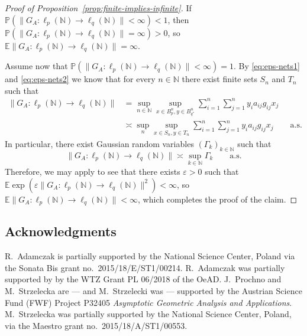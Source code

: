 \documentclass[a4paper]{amsart}
\theoremstyle{definition}
\theoremstyle{remark}
\numberwithin{equation}{section}
\newcommand*{\NN}{\mathbb{N}}
\newcommand*{\EE}{\mathbb{E}}
\newcommand*{\PP}{\mathbb{P}}
\begin{document}
\begin{proof}[Proof of Proposition~\ref{prop:finite-implies-infinite}]
	If $\PP(\|G_A\colon \ell_p(\NN) \to \ell_q(\NN) \| <\infty ) <1$, then $\PP(\|G_A\colon \ell_p(\NN) \to \ell_q(\NN) \| =\infty ) >0$, so $\EE \|G_A\colon \ell_p(\NN) \to \ell_q(\NN) \| =\infty $.
	
	 Assume now that $\PP(\|G_A\colon \ell_p(\NN) \to \ell_q(\NN) \| <\infty ) =1$. By \eqref{eq:eps-nets1} and \eqref{eq:eps-nets2} we know that for every $n\in\NN$ there exist finite sets $S_n$ and $T_n$ such that
	 \begin{align*}
 	\|G_A\colon \ell_p(\NN) \to \ell_q(\NN) \|
	&=  \sup_{n\in \NN} \sup_{x\in B_p^n, y\in B_{q^\ast}^n}  \sum_{i=1}^n \sum_{j=1}^n  y_i a_{ij} g_{ij} x_j
		\\ &\asymp	\sup_n \sup_{x\in S_n, y\in T_n}  \sum_{i=1}^n \sum_{j=1}^n  y_i a_{ij} g_{ij} x_j 	\qquad \text{a.s.}
	 \end{align*}
	 In particular, there exist Gaussian random variables $(\Gamma_k)_{k\in \NN}$ such that
	 \[
	 \|G_A\colon \ell_p(\NN) \to \ell_q(\NN) \|
		\asymp
		\sup_{k\in \NN} \Gamma_k \qquad \text{a.s.}
	\]
	  Therefore, we may apply \cite[(1.2)]{LandauShepp} to see that there exists $\varepsilon >0$ such that $\EE \exp(\varepsilon  \|G_A\colon \ell_p(\NN) \to \ell_q(\NN) \|^2 ) < \infty$, so $\EE \|G_A\colon \ell_p(\NN) \to \ell_q(\NN) \| <\infty $, which completes the proof of the claim.
	\end{proof}

\medskip

\subsection*{Acknowledgments}
R.~Adamczak is partially supported by the  National Science Center, Poland via the Sonata Bis  grant  no.\ 2015/18/E/ST1/00214. R.~Adamczak was partially supported by by the WTZ Grant PL 06/2018 of the OeAD.  J.~Prochno and M.~Strzelecka are --- and M.~Strzelecki was --- supported by the Austrian Science Fund (FWF) Project P32405 \textit{Asymptotic Geometric Analysis and Applications}.
M.~Strzelecka was partially supported by the National Science Center, Poland,
via the Maestro grant no.\ 2015/18/A/ST1/00553. 

  
  
\end{document}
